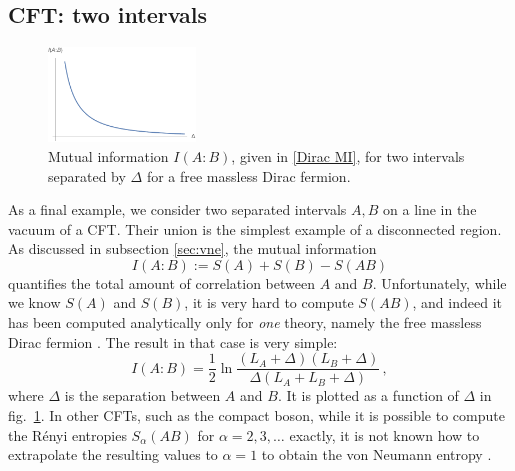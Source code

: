 \documentclass[11pt]{article}
\begin{document}
\subsection{CFT: two intervals}
\label{sec:two intervals}

\begin{figure}[tbp]
\centering
\includegraphics[width=0.35\textwidth]{figs/MI}
\caption{\label{fig:MI}
Mutual information $I(A:B)$, given in \eqref{Dirac MI}, for two intervals separated by $\Delta$ for a free massless Dirac fermion.
}
\end{figure}

As a final example, we consider two separated intervals $A,B$ on a line in the vacuum of a CFT. Their union is the simplest example of a disconnected region. As discussed in subsection \ref{sec:vne}, the mutual information
\begin{equation}
I(A:B):=S(A)+S(B)-S(AB)
\end{equation}
quantifies the total amount of correlation between $A$ and $B$. Unfortunately, while we know $S(A)$ and $S(B)$, it is very hard to compute $S(AB)$, and indeed it has been computed analytically only for \emph{one} theory, namely the free massless Dirac fermion \cite{Casini:2004bw,Casini:2005rm}. The result in that case is very simple:
\begin{equation}\label{Dirac MI}
I(A:B) = \frac12\ln\frac{(L_A+\Delta)(L_B+\Delta)}{\Delta(L_A+L_B+\Delta)}\,,
\end{equation}
where $\Delta$ is the separation between $A$ and $B$. It is plotted as a function of $\Delta$ in fig.\ \ref{fig:MI}. In other CFTs, such as the compact boson, while it is possible to compute the R\'enyi entropies $S_\alpha(AB)$ for $\alpha=2,3,\ldots$ exactly, it is not known how to extrapolate the resulting values to $\alpha=1$ to obtain the von Neumann entropy \cite{Calabrese:2009ez,Calabrese:2010he,DeNobili:2015dla,Ruggiero:2018hyl}.
\end{document}
